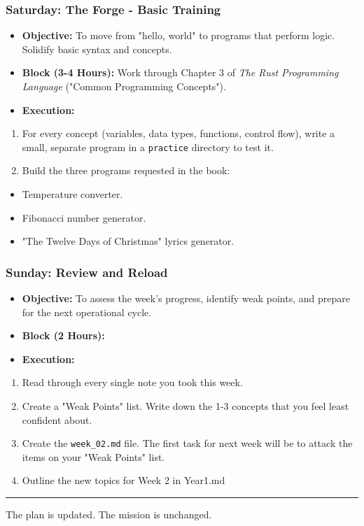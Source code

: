 \subsubsection{\textbf{Saturday: The Forge - Basic Training}}
\begin{itemize}
  \item \textbf{Objective:} To move from "hello, world" to programs that perform logic. Solidify basic syntax and concepts.
  \item \textbf{Block (3-4 Hours):} Work through Chapter 3 of \textit{The Rust Programming Language} ("Common Programming Concepts").
  \item \textbf{Execution:}
\end{itemize}
\begin{enumerate}
  \item For every concept (variables, data types, functions, control flow), write a small, separate program in a \texttt{practice} directory to test it.
  \item Build the three programs requested in the book:
\end{enumerate}
\begin{itemize}
  \item Temperature converter.
  \item Fibonacci number generator.
  \item "The Twelve Days of Christmas" lyrics generator.

\end{itemize}
\subsubsection{\textbf{Sunday: Review and Reload}}
\begin{itemize}
  \item \textbf{Objective:} To assess the week's progress, identify weak points, and prepare for the next operational cycle.
  \item \textbf{Block (2 Hours):}
  \item \textbf{Execution:}
\end{itemize}
\begin{enumerate}
  \item Read through every single note you took this week.
  \item Create a "Weak Points" list. Write down the 1-3 concepts that you feel least confident about.
  \item Create the \texttt{week\_02.md} file. The first task for next week will be to attack the items on your "Weak Points" list.
  \item Outline the new topics for Week 2 in Year1.md

\end{enumerate}
\noindent\rule{\textwidth}{0.4pt}

The plan is updated. The mission is unchanged.
